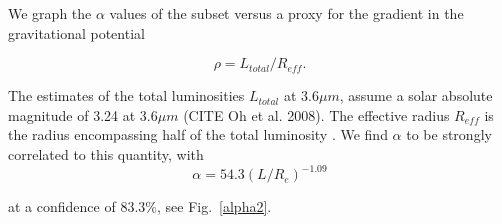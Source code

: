 \documentclass[reprint,%
 amsmath,amssymb,
 aps,
]{revtex4-1}
\begin{document}


  We graph the  $\alpha$ values of the subset versus a proxy for the gradient in the gravitational potential
  
   \begin{equation}
     \rho = L_{total}/R_{eff}.
 \end{equation}
 
 The  estimates of the  total luminosities $L_{total}$ at $3.6 \mu m$,  assume a solar
absolute magnitude of 3.24 at $3.6 \mu m$ (CITE Oh et al. 2008). The effective radius $R_{eff}$ is    the radius encompassing half of the total luminosity \citet{2016Lelli}.  We find $\alpha$  to be   strongly correlated to  this quantity, with 
\begin{equation}
    \alpha = 54.3 (L/R_e)^{-1.09}
\end{equation}

at a confidence of $83.3\%$, see Fig.~\ref{alpha2}.
  
\end{document}
